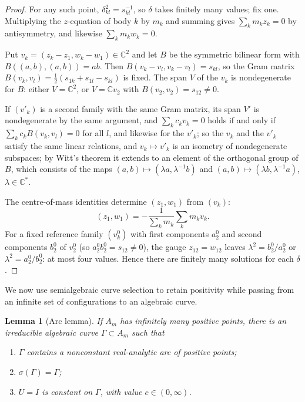 \documentclass[Threeside,11pt]{article}
\newtheorem{lemma}[theorem]{Lemma}
\theoremstyle{definition}
\theoremstyle{remark}
\numberwithin{equation}{section}
\newcommand{\C}{\mathbb C}\newcommand{\T}{\mathbb T}
\theoremstyle{remark}
\newenvironment{romanlist}{\begin{enumerate}\renewcommand{\labelenumi}{(\roman{enumi})}%
  \renewcommand{\theenumi}{\roman{enumi}}}{\end{enumerate}}
\begin{document}
\begin{proof}
For any such point, $\delta_{kl}^2=s_{kl}^{-1}$, so $\delta$ takes finitely many values; fix one.
Multiplying the $z$-equation of body $k$ by $m_k$ and summing gives $\sum_km_kz_k=0$ by
antisymmetry, and likewise $\sum_km_kw_k=0$.

Put $v_k=(z_k-z_1,w_k-w_1)\in\C^2$ and let $B$ be
the symmetric bilinear form with $B((a,b),(a,b))=ab$.  Then $B(v_k-v_l,v_k-v_l)=s_{kl}$, so the
Gram matrix $B(v_k,v_l)=\frac12(s_{1k}+s_{1l}-s_{kl})$ is fixed.  The span $V$ of the $v_k$ is
nondegenerate for $B$: either $V=\C^2$, or $V=\C v_2$ with $B(v_2,v_2)=s_{12}\ne0$.

If
$(v'_k)$ is a second family with the same Gram matrix, its span $V'$ is nondegenerate by the
same argument, and $\sum_kc_kv_k=0$ holds if and only if $\sum_kc_kB(v_k,v_l)=0$ for all $l$,
and likewise for the $v'_k$; so the $v_k$ and the $v'_k$ satisfy the same linear relations, and
$v_k\mapsto v'_k$ is an isometry of nondegenerate subspaces; by Witt's theorem it extends to an
element of the orthogonal group of $B$, which consists of the maps $(a,b)\mapsto(\lambda a,
\lambda^{-1}b)$ and $(a,b)\mapsto(\lambda b,\lambda^{-1}a)$, $\lambda\in\C^*$.

The centre-of-mass identities determine $(z_1,w_1)$ from $(v_k)$:
\[
 (z_1,w_1)=-\frac{1}{\sum_km_k}\sum_km_kv_k.
\]  For a fixed reference family $(v^0_k)$ with first
components $a^0_2$ and second components $b^0_2$ of $v^0_2$ (so $a^0_2b^0_2=s_{12}\ne0$), the gauge
$z_{12}=w_{12}$ leaves $\lambda^2=b^0_2/a^0_2$ or $\lambda^2=a^0_2/b^0_2$: at most four values.
Hence there are finitely many solutions for each $\delta$.
\end{proof}

We now use semialgebraic curve selection to retain positivity while passing from an infinite
set of configurations to an algebraic curve.

\begin{lemma}[Arc lemma]\label{lem:arc}
If $A_m$ has infinitely many positive points, there is an irreducible algebraic curve
$\Gamma\subset A_m$ such that
\begin{romanlist}
  \item $\Gamma$ contains a nonconstant real-analytic arc of positive points;
  \item $\sigma(\Gamma)=\Gamma$;
  \item $U=I$ is constant on $\Gamma$, with value $c\in(0,\infty)$.
\end{romanlist}
\end{lemma}
\end{document}
